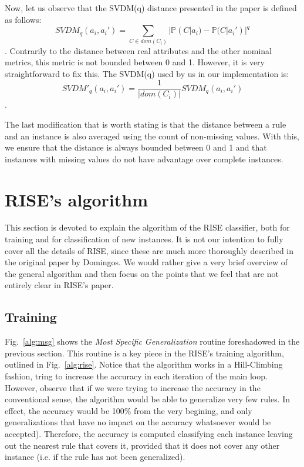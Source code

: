 \documentclass[a4paper]{article}
\begin{document}
Now, let us observe that the SVDM(q) distance presented in the paper is defined as follows:
\[ SVDM_q(a_i, a_i') = \sum_{C \in dom(C_i)} | \mathbb{P}(C|a_i) - \mathbb{P}(C|a_i') |^q \].
Contrarily to the distance between real attributes and the other nominal metrics, this metric is not bounded between 0 and 1. However, it is very straightforward to fix this. The SVDM(q) used by us in our implementation is:
\[ SVDM'_q(a_i, a_i') = \frac{1}{|dom(C_i)|} SVDM_q(a_i, a_i') \].

The last modification that is worth stating is that the distance between a rule and an instance is also averaged using the count of non-missing values. With this, we ensure that the distance is always bounded between 0 and 1 and that instances with missing values do not have advantage over complete instances.

\section{RISE's algorithm}
\label{sec:algorithm}

This section is devoted to explain the algorithm of the RISE classifier, both for training and for classification of new instances. It is not our intention to fully cover all the details of RISE, since these are much more thoroughly described in the original paper by Domingos. We would rather give a very brief overview of the general algorithm and then focus on the points that we feel that are not entirely clear in RISE's paper.

\subsection{Training}

Fig.~\ref{alg:msg} shows the \emph{Most Specific Generalization} routine foreshadowed in the previous section. This routine is a key piece in the RISE's training algorithm, outlined in Fig.~\ref{alg:rise}. Notice that the algorithm works in a Hill-Climbing fashion, tring to increase the accuracy in each iteration of the main loop. However, observe that if we were trying to increase the accuracy in the conventional sense, the algorithm would be able to generalize very few rules. In effect, the accuracy would be 100\% from the very begining, and only generalizations that have no impact on the accuracy whatsoever would be accepted). Therefore, the accuracy is computed classifying each instance leaving out the nearest rule that covers it, provided that it does not cover any other instance (i.e. if the rule has not been generalized).
\end{document}
